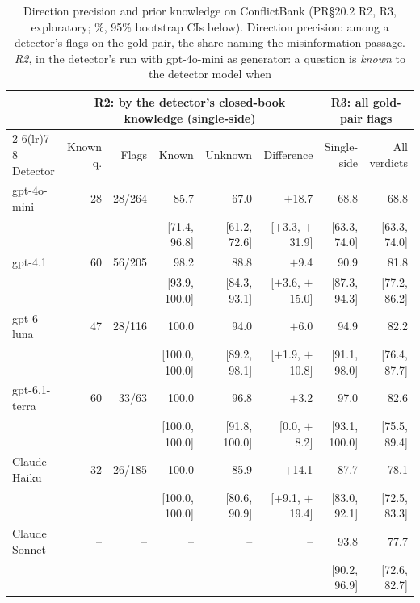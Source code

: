 \begin{table}[t]
\centering\small
\setlength{\tabcolsep}{5pt}
\begin{tabular}{@{}lrrrrrrr@{}}
\toprule
& \multicolumn{5}{c}{R2: by the detector's closed-book knowledge (single-side)} & \multicolumn{2}{c}{R3: all gold-pair flags} \\
\cmidrule(lr){2-6}\cmidrule(lr){7-8}
Detector & Known q. & Flags & Known & Unknown & Difference & Single-side & All verdicts \\
\midrule
gpt-4o-mini & 28 & 28/264 & 85.7 & 67.0 & $+$18.7 & 68.8 & 68.8 \\
& & & {\scriptsize [71.4, 96.8]} & {\scriptsize [61.2, 72.6]} & {\scriptsize [$+$3.3, $+$31.9]} & {\scriptsize [63.3, 74.0]} & {\scriptsize [63.3, 74.0]} \\[1pt]
gpt-4.1 & 60 & 56/205 & 98.2 & 88.8 & $+$9.4 & 90.9 & 81.8 \\
& & & {\scriptsize [93.9, 100.0]} & {\scriptsize [84.3, 93.1]} & {\scriptsize [$+$3.6, $+$15.0]} & {\scriptsize [87.3, 94.3]} & {\scriptsize [77.2, 86.2]} \\[1pt]
gpt-6-luna & 47 & 28/116 & 100.0 & 94.0 & $+$6.0 & 94.9 & 82.2 \\
& & & {\scriptsize [100.0, 100.0]} & {\scriptsize [89.2, 98.1]} & {\scriptsize [$+$1.9, $+$10.8]} & {\scriptsize [91.1, 98.0]} & {\scriptsize [76.4, 87.7]} \\[1pt]
gpt-6.1-terra & 60 & 33/63 & 100.0 & 96.8 & $+$3.2 & 97.0 & 82.6 \\
& & & {\scriptsize [100.0, 100.0]} & {\scriptsize [91.8, 100.0]} & {\scriptsize [0.0, $+$8.2]} & {\scriptsize [93.1, 100.0]} & {\scriptsize [75.5, 89.4]} \\[1pt]
Claude Haiku & 32 & 26/185 & 100.0 & 85.9 & $+$14.1 & 87.7 & 78.1 \\
& & & {\scriptsize [100.0, 100.0]} & {\scriptsize [80.6, 90.9]} & {\scriptsize [$+$9.1, $+$19.4]} & {\scriptsize [83.0, 92.1]} & {\scriptsize [72.5, 83.3]} \\[1pt]
Claude Sonnet & -- & -- & -- & -- & -- & 93.8 & 77.7 \\
& & & & & & {\scriptsize [90.2, 96.9]} & {\scriptsize [72.6, 82.7]} \\[1pt]
\bottomrule
\end{tabular}
\caption{Direction precision and prior knowledge on ConflictBank (PR\S20.2 R2, R3, exploratory; \%, 95\% bootstrap CIs
below). Direction precision: among a detector's flags on the gold pair, the share naming the misinformation passage.
\emph{R2}, in the detector's run with gpt-4o-mini as generator: a question is \emph{known} to the detector model when
}
\end{table}
